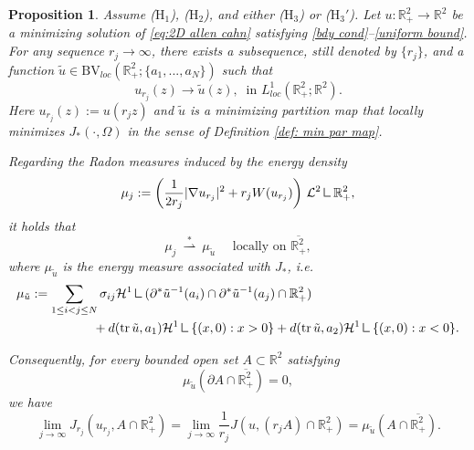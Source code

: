 \documentclass[leqno,11pt]{amsart}
\let\pa=\partial
\let\f=\frac
\let\pa=\partial
\let\na=\nabla
\newtheorem{proposition}[theorem]{Proposition}
\theoremstyle{remark}
\newcommand{\BR}{\mathbb{R}}
\newcommand{\ch}{\mathcal{H}^1}
\newcommand{\mres}{\mathbin{\vrule height 1.6ex depth 0pt width 0.13ex\vrule height 0.13ex depth 0pt width 1.1ex}}
\begin{document}
\begin{proposition}\label{prop: compactness of blow-down map}
    Assume ($\mathrm{H}_1$), ($\mathrm{H}_2$), and either ($\mathrm{H}_3$) or ($\mathrm{H}_3'$). Let $u:\BR_+^2 \to \BR^2$ be a minimizing solution of \eqref{eq:2D allen cahn} satisfying \eqref{bdy cond}--\eqref{uniform bound}. For any sequence $r_j\to\infty$, there exists a subsequence, still denoted by $\{r_j\}$, and a function $\tilde{u}\in \mathrm{BV}_{loc}(\BR_+^2; \{a_1,...,a_N\})$ such that 
    \begin{equation}\label{L1 comp}
        u_{r_{j}}(z) \to \tilde{u}(z),\ \text{ in } L_{loc}^1(\BR_+^2;\BR^2). 
    \end{equation}
    Here $u_{r_{j}}(z):=u(r_{j}z)$ and $\tilde{u}$ is a minimizing partition map  that locally minimizes $J_*(\cdot,\Omega)$ in the sense of Definition \ref{def: min par map}.

    Regarding the Radon measures induced by the energy density
    \begin{equation*}
        \mu_j:= \bigg(\frac{1}{2r_j}|\na u_{r_j}|^2+r_j W(u_{r_j})\bigg)\ \mathcal{L}^2\mres \BR_+^2,
    \end{equation*}
    it holds that 
    \begin{equation}\label{comp for measure}
        \mu_j\ \overset{\ast}{\rightharpoonup}\ \mu_{\tilde{u}}  \quad \text{ locally on }\overline{\BR_+^2}, 
    \end{equation}
    where $\mu_{\tilde{u}}$ is the energy measure associated with $J_*$, i.e.
    \begin{equation}\label{def:mu tu}
    \begin{split}
        &\mu_{\tilde{u}}:= \sum\limits_{1\leq i<j\leq N} \sigma_{ij}\ch\mres (\pa^* \tilde{u}^{-1}(a_i)\cap \pa^*\tilde{u}^{-1}(a_j)\cap\BR_+^2)\\
        &\qquad\qquad \qquad+ d(\mathrm{tr}\, \tilde{u},a_1)\ch\mres\{(x,0):x>0\}+  d(\mathrm{tr}\, \tilde{u},a_2)\ch\mres\{(x,0):x<0\}.
        \end{split}
    \end{equation}

    Consequently, for every bounded open set $A\subset \BR^2$ satisfying
    \begin{equation*}
        \mu_{\tilde{u}}(\pa A\cap \overline{\BR^2_+})=0,
    \end{equation*}
    we have 
    \begin{equation}\label{energy density conv}
        \lim\limits_{j\to\infty} J_{r_j}(u_{r_j},A\cap \BR_+^2)= \lim\limits_{j\to\infty}\f{1}{r_j}  J(u, (r_jA) \cap \BR_+^2)=\mu_{\tilde{u}}(A\cap \overline{\BR^2_+}).
    \end{equation}
\end{proposition}
\end{document}
